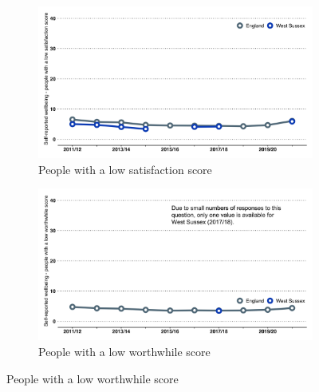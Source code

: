 \begin{figure}
    \caption[Measurement of wellbeing in the Integrated Household Survey.]{Measurement of wellbeing in the Integrated Household Survey.}\label{fig:wellb-survey}
    \vspace*{3mm}
    \centering
    \begin{subfigure}[b]{0.48\textwidth}
        \centering
        \caption{People with a low satisfaction score}\label{fig:wellb-surv:satis}
        \includegraphics[width=\textwidth]{images/low_satisfaction_line.png}
    \end{subfigure}
    \begin{subfigure}[b]{0.48\textwidth}
        \centering
        \caption{People with a low worthwhile score}\label{fig:wellb-surv:loww}
        \includegraphics[width=\textwidth]{images/low_worthwhile_line.png}

\end{subfigure}
\end{figure}
